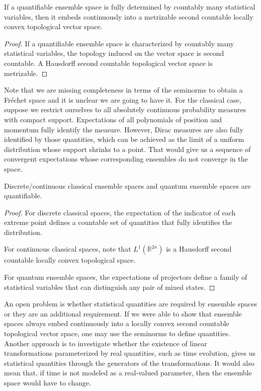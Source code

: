 \begin{mathSection}
\begin{prop}
	If a quantifiable ensemble space is fully determined by countably many statistical variables, then it embeds continuously into a metrizable second countable locally convex topological vector space.
\end{prop}

\begin{proof}
	If a quantifiable ensemble space is characterized by countably many statistical variables, the topology induced on the vector space is second countable. A Hausdorff second countable topological vector space is metrizable.
\end{proof}

\begin{remark}
	Note that we are missing completeness in terms of the seminorms to obtain a Fr\'echet space and it is unclear we are going to have it. For the classical case, suppose we restrict ourselves to all absolutely continuous probability measures with compact support. Expectations of all polynomials of position and momentum fully identify the measure. However, Dirac measures are also fully identified by those quantities, which can be achieved as the limit of a uniform distribution whose support shrinks to a point. That would give us a sequence of convergent expectations whose corresponding ensembles do not converge in the space.
\end{remark}

\begin{prop}
	Discrete/continuous classical ensemble spaces and quantum ensemble spaces are quantifiable.
\end{prop}

\begin{proof}
	For discrete classical spaces, the expectation of the indicator of each extreme point defines a countable set of quantities that fully identifies the distribution.
	
	For continuous classical spaces, note that $L^1(\mathbb{R}^{2n})$ is a Hausdorff second countable locally convex topological space.
	
	For quantum ensemble spaces, the expectations of projectors define a family of statistical variables that can distinguish any pair of mixed states.
\end{proof}
\end{mathSection}

An open problem is whether statistical quantities are required by ensemble spaces or they are an additional requirement. If we were able to show that ensemble spaces always embed continuously into a locally convex second countable topological vector space, one may use the seminorms to define quantities. Another approach is to investigate whether the existence of linear transformations parameterized by real quantities, such as time evolution, gives us statistical quantities through the generators of the transformations. It would also mean that, if time is not modeled as a real-valued parameter, then the ensemble space would have to change.

